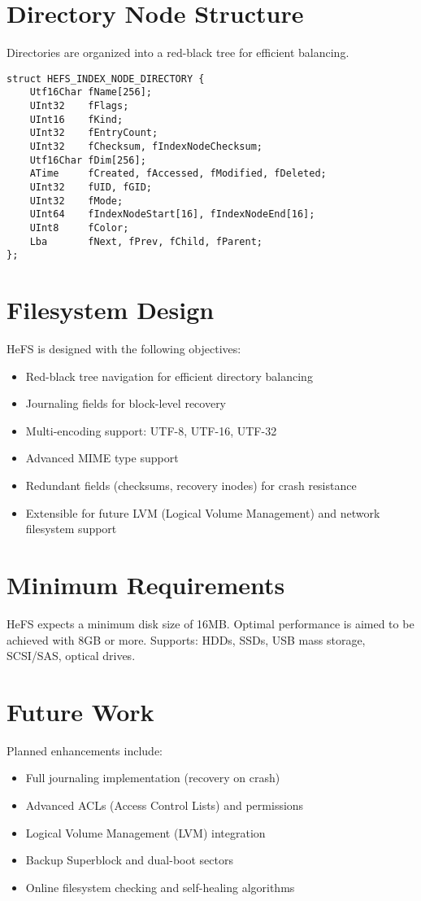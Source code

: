 \documentclass{article}
\begin{document}
\section{Directory Node Structure}
Directories are organized into a red-black tree for efficient balancing.

\begin{lstlisting}[style=cstyle, caption={HEFS\_INDEX\_NODE\_DIRECTORY structure}]
struct HEFS_INDEX_NODE_DIRECTORY {
    Utf16Char fName[256];
    UInt32    fFlags;
    UInt16    fKind;
    UInt32    fEntryCount;
    UInt32    fChecksum, fIndexNodeChecksum;
    Utf16Char fDim[256];
    ATime     fCreated, fAccessed, fModified, fDeleted;
    UInt32    fUID, fGID;
    UInt32    fMode;
    UInt64    fIndexNodeStart[16], fIndexNodeEnd[16];
    UInt8     fColor;
    Lba       fNext, fPrev, fChild, fParent;
};
\end{lstlisting}

\section{Filesystem Design}

HeFS is designed with the following objectives:
\begin{itemize}
    \item Red-black tree navigation for efficient directory balancing
    \item Journaling fields for block-level recovery
    \item Multi-encoding support: UTF-8, UTF-16, UTF-32
    \item Advanced MIME type support
    \item Redundant fields (checksums, recovery inodes) for crash resistance
    \item Extensible for future LVM (Logical Volume Management) and network filesystem support
\end{itemize}

\section{Minimum Requirements}

HeFS expects a minimum disk size of 16MB. Optimal performance is aimed to be achieved with 8GB or more.
Supports: HDDs, SSDs, USB mass storage, SCSI/SAS, optical drives.

\section{Future Work}
Planned enhancements include:
\begin{itemize}
    \item Full journaling implementation (recovery on crash)
    \item Advanced ACLs (Access Control Lists) and permissions
    \item Logical Volume Management (LVM) integration
    \item Backup Superblock and dual-boot sectors
    \item Online filesystem checking and self-healing algorithms
\end{itemize}
\end{document}
